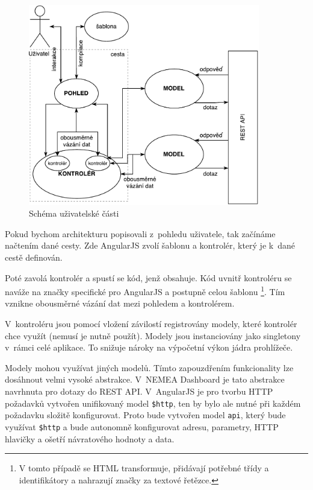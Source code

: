 \begin{figure}[ht]
    \centering
    \includegraphics[width=0.9\textwidth]{fig/frontend.pdf}
    \caption{Schéma uživatelské části} \label{fig:frontend}
\end{figure}

Pokud bychom architekturu popisovali z~pohledu uživatele, tak začínáme načtením dané cesty. Zde AngularJS zvolí šablonu a kontrolér, který je k~dané cestě definován. 

Poté zavolá kontrolér a spustí se kód, jenž obsahuje. Kód uvnitř kontroléru se naváže na značky specifické pro AngularJS a postupně celou šablonu \footnote{V tomto případě se HTML transformuje, přidávají potřebné třídy a identifikátory a nahrazují značky za textové řetězce.}. Tím vznikne obousměrné vázání dat mezi pohledem a kontrolérem.

V~kontroléru jsou pomocí vložení závilostí registrovány modely, které kontrolér chce využít (nemusí je nutně použít). Modely jsou instanciovány jako singletony v~rámci celé aplikace. To snižuje nároky na výpočetní výkon jádra prohlížeče.

Modely mohou využívat jiných modelů. Tímto zapouzdřením funkcionality lze dosáhnout velmi vysoké abstrakce. V~NEMEA Dashboard je tato abstrakce navrhnuta pro dotazy do REST API. V~AngularJS je pro tvorbu HTTP požadavků vytvořen unifikovaný model \texttt{\$http}, ten by bylo ale nutné při každém požadavku složitě konfigurovat. Proto bude vytvořen model \texttt{api}, který bude využívat \texttt{\$http} a bude autonomně konfigurovat adresu, parametry, HTTP hlavičky a ošetří návratového hodnoty a data.


